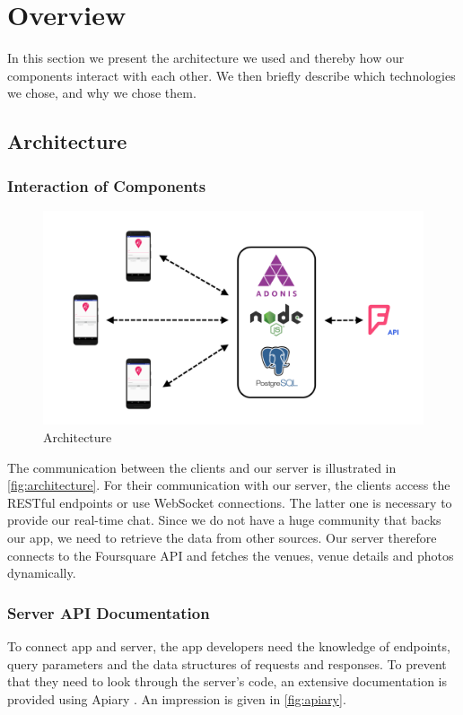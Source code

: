 \documentclass[11pt, accentcolor=tud1c]{tudreport}
\begin{document}
\chapter{Overview}\label{ch:overview}
In this section we present the architecture we used and thereby how our components interact with each other. We then briefly describe which technologies we chose, and why we chose them.
\section{Architecture}\label{sec:architecture}
\subsection{Interaction of Components}
\begin{figure}[ht]
	\includegraphics[width=\textwidth]{./res/architecture.png}
	\caption{Architecture}
	\label{fig:architecture}
\end{figure}
The communication between the clients and our server is illustrated in \autoref{fig:architecture}.
For their communication with our server, the clients access the RESTful endpoints or use WebSocket connections. The latter one is necessary to provide our real-time chat. Since we do not have a huge community that backs our app, we need to retrieve the data from other sources. Our server therefore connects to the Foursquare API and fetches the venues, venue details and photos dynamically.
\subsection{Server API Documentation}
To connect app and server, the app developers need the knowledge of endpoints, query parameters and the data structures of requests and responses. To prevent that they need to look through the server's code, an extensive documentation is provided using Apiary \cite{apiary}. An impression is given in \autoref{fig:apiary}.
\end{document}
